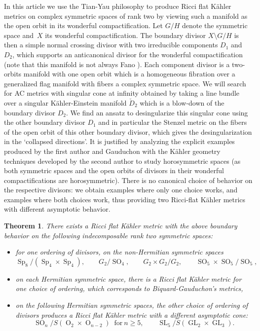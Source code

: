 \documentclass[10pt]{amsart}
\DeclareMathOperator{\rO}{O}
\theoremstyle{plain}
\newtheorem{thm}{Theorem}[section]
\theoremstyle{definition}
\DeclareMathOperator{\SL}{SL}
\DeclareMathOperator{\Sp}{Sp}
\DeclareMathOperator{\SO}{SO}
\DeclareMathOperator{\GL}{GL}
\begin{document}
In this article we use the Tian-Yau philosophy to produce Ricci flat
Kähler metrics on complex symmetric spaces of rank two by viewing such
a manifold as the open orbit in its wonderful compactification.
Let $G/H$ denote the symmetric space and~$X$ its wonderful compactification.
The boundary divisor $X\setminus G/H$ is then a simple normal crossing divisor
with two irreducible components $D_1$ and $D_2$, which supports an anticanonical
divisor for the wonderful compactification (note that this manifold is not always
Fano \cite{Ruz12}). Each component divisor is a two-orbits manifold
with one open orbit which is a homogeneous fibration over a
generalized flag manifold with fibers a complex symmetric space. We
will search for AC metrics with singular cone at infinity obtained by
taking a line bundle over a singular Kähler-Einstein manifold $\check{D}_2$ which is
a blow-down of the boundary divisor $D_2$. We find an ansatz to
desingularize this singular cone using the other boundary divisor $D_1$ and
in particular the Stenzel metric on the fibers of the open orbit of
this other boundary divisor, which gives the desingularization in the
`collapsed directions'. It is justified by analyzing the explicit
examples produced by the first author and Gauduchon with the Kähler
geometry techniques developed by the second author to study
horosymmetric spaces \cite{DelHoro} (as both symmetric spaces and the
open orbits of divisors in their wonderful compactifications are
horosymmetric). There is no canonical choice of behavior on the
respective divisors: we obtain examples where only one choice works,
and examples where both choices work, thus providing two Ricci-flat
Kähler metrics with different asymptotic behavior.

\begin{thm}
There exists a Ricci flat Kähler metric with the above boundary behavior on the following
indecomposable rank two symmetric spaces:
\begin{itemize}
\item for one ordering of divisors, on the non-Hermitian symmetric spaces
\[ \Sp_8/(\Sp_4\times \Sp_4), \qquad G_2/\SO_4, \qquad G_2\times G_2/G_2, \qquad \SO_5\times \SO_5/\SO_5, \]
\item on each Hermitian symmetric space, there is a Ricci flat Kähler metric for one choice
of ordering, which corresponds to Biquard-Gauduchon's metrics,
\item on the following Hermitian symmetric spaces, the other choice of ordering of divisors produces a
Ricci flat Kähler metric with a different asymptotic cone:
\[ \SO_n/S(\rO_2\times \rO_{n-2})~\text{ for}~n\geq 5, \qquad
\SL_5/S(\GL_2\times \GL_3). \]
\end{itemize}
\end{thm}
\end{document}
